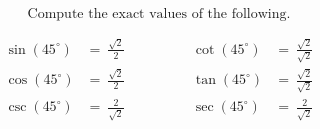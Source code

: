 $$
\text{Compute the exact values of the following.}
$$

$$
\begin{align*}
  \sin(45^{\circ}) &=\ \frac{\sqrt{2}}{2} \qquad&\qquad \cot(45^{\circ}) &=\ \frac{\sqrt{2}}{\sqrt{2}} \\[2ex]
  \cos(45^{\circ}) &=\ \frac{\sqrt{2}}{2} \qquad&\qquad \tan(45^{\circ}) &=\ \frac{\sqrt{2}}{\sqrt{2}} \\[2ex]
  \csc(45^{\circ}) &=\ \frac{2}{\sqrt{2}} \qquad&\qquad \sec(45^{\circ}) &=\ \frac{2}{\sqrt{2}}
\end{align*}
$$
